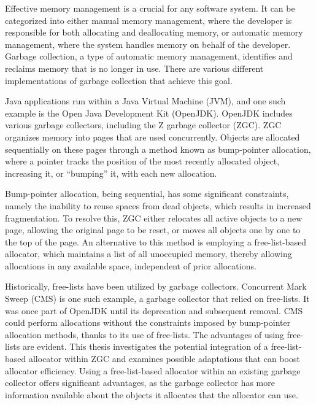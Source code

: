 Effective memory management is a crucial for any software system. It can be categorized into either manual memory management, where the developer is responsible for both allocating and deallocating memory, or automatic memory management, where the system handles memory on behalf of the developer. Garbage collection, a type of automatic memory management, identifies and reclaims memory that is no longer in use. There are various different implementations of garbage collection that achieve this goal.

Java applications run within a Java Virtual Machine (JVM), and one such example is the Open Java Development Kit (OpenJDK). OpenJDK includes various garbage collectors, including the Z garbage collector (ZGC). ZGC organizes memory into pages that are used concurrently. Objects are allocated sequentially on these pages through a method known as bump-pointer allocation, where a pointer tracks the position of the most recently allocated object, increasing it, or ``bumping'' it, with each new allocation.

Bump-pointer allocation, being sequential, has some significant constraints, namely the inability to reuse spaces from dead objects, which results in increased fragmentation. To resolve this, ZGC either relocates all active objects to a new page, allowing the original page to be reset, or moves all objects one by one to the top of the page. An alternative to this method is employing a free-list-based allocator, which maintains a list of all unoccupied memory, thereby allowing allocations in any available space, independent of prior allocations.

Historically, free-lists have been utilized by garbage collectors. Concurrent Mark Sweep (CMS) is one such example, a garbage collector that relied on free-lists. It was once part of OpenJDK until its deprecation and subsequent removal. CMS could perform allocations without the constraints imposed by bump-pointer allocation methods, thanks to its use of free-lists. The advantages of using free-lists are evident. This thesis investigates the potential integration of a free-list-based allocator within ZGC and examines possible adaptations that can boost allocator efficiency. Using a free-list-based allocator within an existing garbage collector offers significant advantages, as the garbage collector has more information available about the objects it allocates that the allocator can use.

